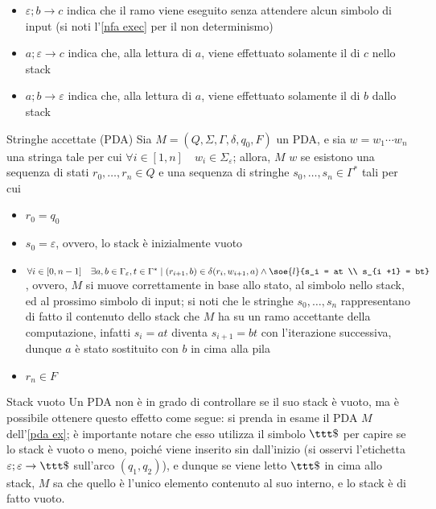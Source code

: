 \documentclass[a4paper, 12pt]{report}
\begin{document}
\begin{example}[PDA]
        \begin{itemize}
            \item $\varepsilon; b \to c$ indica che il ramo viene eseguito senza attendere alcun simbolo di input (si noti l'\cref{nfa exec} per il non determinismo)
            \item $a; \varepsilon \to c$ indica che, alla lettura di $a$, viene effettuato solamente il  di $c$ nello stack
            \item $a; b \to \varepsilon$ indica che, alla lettura di $a$, viene effettuato solamente il  di $b$ dallo stack
        \end{itemize}
    \end{example}

    \begin{frameddefn}{Stringhe accettate (PDA)}
        Sia $M = (Q, \Sigma, \Gamma, \delta, q_0, F)$ un PDA, e sia $w = w_1\cdots w_n$ una stringa tale per cui $\forall i \in [1, n] \quad w_i \in \Sigma_\varepsilon$; allora, $M$  $w$ se esistono una sequenza di stati $r_0, \ldots, r_n \in Q$ e una sequenza di stringhe $s_0, \ldots, s_n \in \Gamma ^*$ tali per cui

        \begin{itemize}
            \item $r_0 = q_0$
            \item $s_0 = \varepsilon$, ovvero, lo stack è inizialmente vuoto
            \item $\forall i \in [0, n - 1] \quad \exists a, b \in \Gamma_\varepsilon, t \in \Gamma^* \mid (r_{i + 1}, b) \in \delta(r_i, w_{i + 1}, a) \land \soe{l}{s_i = at \\ s_{i +1} = bt}$, ovvero, $M$ si muove correttamente in base allo stato, al simbolo nello stack, ed al prossimo simbolo di input; si noti che le stringhe $s_0, \ldots, s_n$ rappresentano di fatto il contenuto dello stack che $M$ ha su un ramo accettante della computazione, infatti $s_i = at$ diventa $s_{i + 1} = bt$ con l'iterazione successiva, dunque $a$ è stato sostituito con $b$ in cima alla pila
            \item $r_n \in F$
        \end{itemize}
    \end{frameddefn}

    \begin{framedobs}[label={pda empty stack}]{Stack vuoto}
        Un PDA non è in grado di controllare se il suo stack è vuoto, ma è possibile ottenere questo effetto come segue: si prenda in esame il PDA $M$ dell'\cref{pda ex}; è importante notare che esso utilizza il simbolo $\ttt \$$ per capire se lo stack è vuoto o meno, poiché viene inserito sin dall'inizio (si osservi l'etichetta $\varepsilon; \varepsilon \to \ttt \$$ sull'arco $(q_1, q_2)$), e dunque se viene letto $\ttt \$$ in cima allo stack, $M$ sa che quello è l'unico elemento contenuto al suo interno, e lo stack è di fatto vuoto.
    \end{framedobs}
\end{document}
